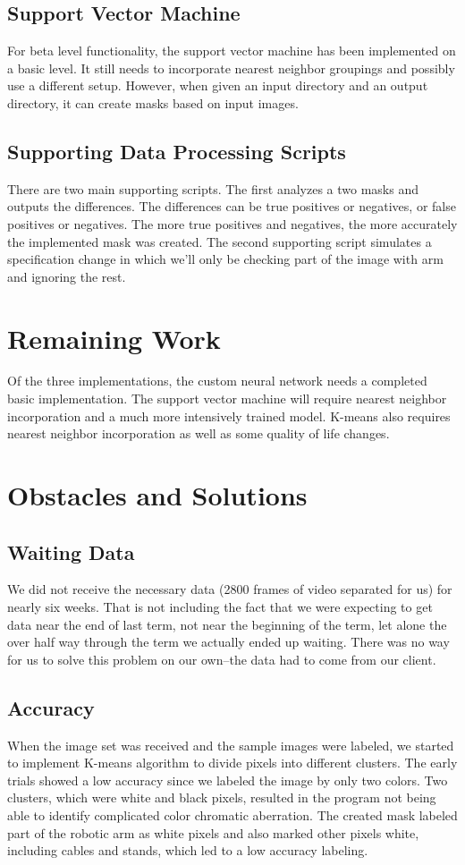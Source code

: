 \documentclass[10pt,journal,compsoc, draftclsnofoot,onecolumn]{IEEEtran}
\begin{document}
\subsection{Support Vector Machine}
For beta level functionality, the support vector machine has been implemented on a basic level.
It still needs to incorporate nearest neighbor groupings and possibly use a different setup.
However, when given an input directory and an output directory, it can create masks based on input images.

\subsection{Supporting Data Processing Scripts}
There are two main supporting scripts.
The first analyzes a two masks and outputs the differences.
The differences can be true positives or negatives, or false positives or negatives.
The more true positives and negatives, the more accurately the implemented mask was created.
The second supporting script simulates a specification change in which we'll only be checking part of the image with arm and ignoring the rest.

\section{Remaining Work}
Of the three implementations, the custom neural network needs a completed basic implementation.
The support vector machine will require nearest neighbor incorporation and a much more intensively trained model.
K-means also requires nearest neighbor incorporation as well as some quality of life changes.

\section{Obstacles and Solutions}
\subsection{Waiting Data}
We did not receive the necessary data (2800 frames of video separated for us) for nearly six weeks. That is not including the fact that we were expecting to get data near the end of last term, not near the beginning of the term, let alone the over half way through the term we actually ended up waiting. There was no way for us to solve this problem on our own--the data had to come from our client.

\subsection{Accuracy}
When the image set was received and the sample images were labeled, we started to implement K-means algorithm to divide pixels into different clusters. The early trials showed a low accuracy since we labeled the image by only two colors. Two clusters, which were white and black pixels, resulted in the program not being able to identify complicated color chromatic aberration. The created mask labeled part of the robotic arm as white pixels and also marked other pixels white, including cables and stands, which led to a low accuracy labeling. \\
\end{document}
